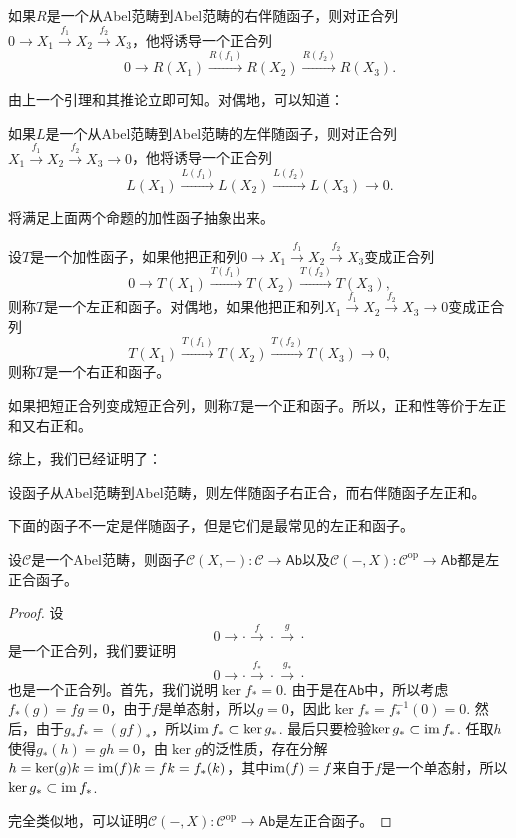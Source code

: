 \begin{pro}
如果$R$是一个从Abel范畴到Abel范畴的右伴随函子，则对正合列$0\to X_1\xrightarrow{f_1} X_2\xrightarrow{f_2} X_3$，他将诱导一个正合列
\[
	0\to R(X_1)\xrightarrow{R(f_1)} R(X_2)\xrightarrow{R(f_2)} R(X_3).
\]
\end{pro}

由上一个引理和其推论立即可知。对偶地，可以知道：

\begin{pro}
如果$L$是一个从Abel范畴到Abel范畴的左伴随函子，则对正合列$X_1\xrightarrow{f_1} X_2\xrightarrow{f_2} X_3 \to 0$，他将诱导一个正合列
\[
	L(X_1)\xrightarrow{L(f_1)} L(X_2)\xrightarrow{L(f_2)} L(X_3) \to 0.
\]
\end{pro}

将满足上面两个命题的加性函子抽象出来。

\begin{para}
设$T$是一个加性函子，如果他把正和列$0\to X_1\xrightarrow{f_1} X_2\xrightarrow{f_2} X_3$变成正合列
\[
	0\to T(X_1)\xrightarrow{T(f_1)} T(X_2)\xrightarrow{T(f_2)} T(X_3),
\]
则称$T$是一个左正和函子。对偶地，如果他把正和列$X_1\xrightarrow{f_1} X_2\xrightarrow{f_2} X_3\to 0$变成正合列
\[
	T(X_1)\xrightarrow{T(f_1)} T(X_2)\xrightarrow{T(f_2)} T(X_3)\to 0,
\]
则称$T$是一个右正和函子。

如果把短正合列变成短正合列，则称$T$是一个正和函子。所以，正和性等价于左正和又右正和。
\end{para}

综上，我们已经证明了：

\begin{thm}
设函子从Abel范畴到Abel范畴，则左伴随函子右正合，而右伴随函子左正和。
\end{thm}

下面的函子不一定是伴随函子，但是它们是最常见的左正和函子。

\begin{pro}\label{homleftexact}
设$\mathcal{C}$是一个Abel范畴，则函子$\mathcal{C}(X,-):\mathcal{C}\to \mathsf{Ab}$以及$\mathcal{C}(-,X):\mathcal{C}^\mathrm{op} \to \mathsf{Ab}$都是左正合函子。
\end{pro}

\begin{proof}
	设
	\[
		0\to\cdot \xrightarrow{f}\cdot \xrightarrow{g}\cdot
	\]
	是一个正合列，我们要证明
	\[
	0\to \cdot \xrightarrow{f_*}\cdot \xrightarrow{g_*}\cdot
	\]
	也是一个正合列。首先，我们说明$\ker f_*=0$. 由于是在$\mathsf{Ab}$中，所以考虑$f_*(g)=fg=0$，由于$f$是单态射，所以$g=0$，因此$\ker f_*=f_*^{-1}(0)=0$. 然后，由于$g_*f_*=(gf)_*$，所以$\operatorname{im} f_*\subset \ker g_*$. 最后只要检验$\ker g_*\subset \operatorname{im} f_*$. 任取$h$使得$g_*(h)=gh=0$，由$\ker g$的泛性质，存在分解$h=\ker(g)k=\operatorname{im}(f)k=fk=f_*(k)$，其中$\operatorname{im}(f)=f$来自于$f$是一个单态射，所以$\ker g_* \subset \operatorname{im} f_*$.

	完全类似地，可以证明$\mathcal{C}(-,X):\mathcal{C}^\text{op} \to \mathsf{Ab}$是左正合函子。
\end{proof}

